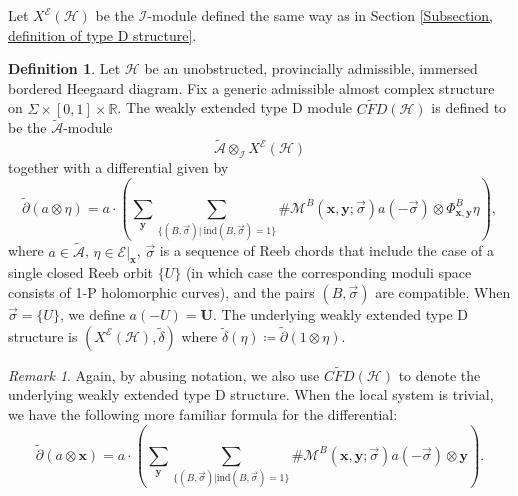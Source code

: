 \documentclass{amsart}
\theoremstyle{definition}
\newtheorem{defn}[thm]{Definition}
\theoremstyle{remark}
\newtheorem{rmk}[thm]{Remark}
\numberwithin{equation}{section}
\numberwithin{equation}{section} \makeatletter
\begin{document}
Let $X^{\mathcal{E}}(\mathcal{H})$ be the $\mathcal{I}$-module defined the same way as in Section \ref{Subsection, definition of type D structure}.
\begin{defn}\label{Definition, weakly extended type D structure}
Let $\mathcal{H}$ be an unobstructed, provincially admissible, immersed bordered Heegaard diagram. Fix a generic admissible almost complex structure on $\Sigma\times [0,1] \times \mathbb{R}$. The weakly extended type D module $\widetilde{CFD}(\mathcal{H})$ is defined to be the $\tilde{\mathcal{A}}$-module $$\tilde{\mathcal{A}}\otimes_{\mathcal{I}}X^{\mathcal{E}}(\mathcal{H})$$ together with a differential given by 
$$\tilde{\partial} (a\otimes \eta)=a\cdot(\sum_{\bm{y}}\sum_{\{(B,\overrightarrow{\sigma})|\ \text{ind}(B,\overrightarrow{\sigma})=1\}}\#\mathcal{M}^B(\bm{x},\bm{y};\overrightarrow{\sigma})a(-\overrightarrow{\sigma})\otimes \Phi^B_{\bm{x},\bm{y}}\eta),$$
where $a\in\tilde{\mathcal{A}}$, $\eta\in \mathcal{E}|_{\bm{x}}$, $\overrightarrow{\sigma}$ is a sequence of Reeb chords that include the case of a single closed Reeb orbit $\{U\}$ (in which case the corresponding moduli space consists of 1-P holomorphic curves), and the pairs $(B,\overrightarrow{\sigma})$ are compatible. When $\overrightarrow{\sigma}=\{U\}$, we define $a(-U)=\bm{U}$. The underlying weakly extended type D structure is $(X^{\mathcal{E}}(\mathcal{H}),\tilde{\delta})$ where $\tilde{\delta}(\eta)\coloneqq \tilde{\partial}(1\otimes \eta)$.
\end{defn}
\begin{rmk}
Again, by abusing notation, we also use $\widetilde{CFD}(\mathcal{H})$ to denote the underlying weakly extended type D structure. When the local system is trivial, we have the following more familiar formula for the differential: 
$$\tilde{\partial} (a\otimes\bm{x})=a\cdot(\sum_{\bm{y}}\sum_{\{(B,\overrightarrow{\sigma})|\text{ind}(B,\overrightarrow{\sigma})=1\}}\#\mathcal{M}^B(\bm{x},\bm{y};\overrightarrow{\sigma})a(-\overrightarrow{\sigma})\otimes \bm{y}).$$
\end{rmk}
\end{document}

